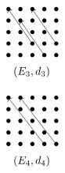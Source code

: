 \documentclass[../main.tex]{subfiles}
\begin{document}
\begin{rem}
\begin{center}
    
\begin{minipage}{0.3\textwidth}
\begin{align*}
&\xymatrix@=0pt{
 \ar@{<-}[]+C;[rrddd]+C\bullet & \bullet & \ar@{<-}[]+C;[rrddd]+C\bullet & \bullet & \bullet \\
 \bullet & \ar@{<-}[]+C;[rrddd]+C\bullet & \bullet & \bullet & \bullet \\
 \bullet & \bullet & \bullet & \bullet & \bullet \\
 \bullet & \bullet & \bullet & \bullet & \bullet \\
 \bullet & \bullet & \bullet & \bullet & \bullet \\
}\\
&\hspace{10pt}(E_3,d_3)
\end{align*}
\end{minipage}
\begin{minipage}{0.3\textwidth}
\begin{align*}
&\xymatrix@=0pt{
  \ar@{<-}[]+C;[rrrdddd]+C\bullet & \ar@{<-}[]+C;[rrrdddd]+C\bullet & \bullet & \bullet & \bullet \\
 \bullet & \bullet & \bullet & \bullet & \bullet \\
 \bullet & \bullet & \bullet & \bullet & \bullet \\
 \bullet & \bullet & \bullet & \bullet & \bullet \\
 \bullet & \bullet & \bullet & \bullet & \bullet \\
}\\
&\hspace{10pt}(E_4,d_4)
\end{align*}
\end{minipage}
\end{center}



\end{rem}
\end{document}
